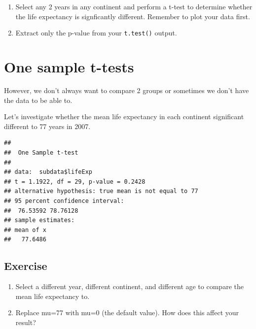\documentclass[]{book}
\makeatletter
\newenvironment{Shaded}{\begin{snugshade}}{\end{snugshade}}
\newcommand{\KeywordTok}[1]{\textcolor[rgb]{0.13,0.29,0.53}{\textbf{#1}}}
\newcommand{\DataTypeTok}[1]{\textcolor[rgb]{0.13,0.29,0.53}{#1}}
\newcommand{\DecValTok}[1]{\textcolor[rgb]{0.00,0.00,0.81}{#1}}
\newcommand{\StringTok}[1]{\textcolor[rgb]{0.31,0.60,0.02}{#1}}
\newcommand{\CommentTok}[1]{\textcolor[rgb]{0.56,0.35,0.01}{\textit{#1}}}
\newcommand{\OperatorTok}[1]{\textcolor[rgb]{0.81,0.36,0.00}{\textbf{#1}}}
\newcommand{\NormalTok}[1]{#1}
\newenvironment{kframe}{%
\medskip{}
\setlength{\fboxsep}{.8em}
 \def\at@end@of@kframe{}%
 \ifinner\ifhmode%
  \def\at@end@of@kframe{\end{minipage}}%
  \begin{minipage}{\columnwidth}%
 \fi\fi%
 \def\FrameCommand##1{\hskip\@totalleftmargin \hskip-\fboxsep
 \colorbox{shadecolor}{##1}\hskip-\fboxsep
     \hskip-\linewidth \hskip-\@totalleftmargin \hskip\columnwidth}%
 \MakeFramed {\advance\hsize-\width
   \@totalleftmargin\z@ \linewidth\hsize
   \@setminipage}}%
 {\par\unskip\endMakeFramed%
 \at@end@of@kframe}
\renewenvironment{Shaded}{\begin{kframe}}{\end{kframe}}
\makeatother
\begin{document}
\begin{enumerate}
\def\labelenumi{\arabic{enumi}.}
\item
  Select any 2 years in any continent and perform a t-test to determine
  whether the life expectancy is signficantly different. Remember to
  plot your data first.
\item
  Extract only the p-value from your \texttt{t.test()} output.
\end{enumerate}

\section{One sample t-tests}\label{one-sample-t-tests}

However, we don't always want to compare 2 groups or sometimes we don't
have the data to be able to.

Let's investigate whether the mean life expectancy in each continent
significant different to 77 years in 2007.

\begin{Shaded}
\end{Shaded}

\begin{verbatim}
## 
##  One Sample t-test
## 
## data:  subdata$lifeExp
## t = 1.1922, df = 29, p-value = 0.2428
## alternative hypothesis: true mean is not equal to 77
## 95 percent confidence interval:
##  76.53592 78.76128
## sample estimates:
## mean of x 
##   77.6486
\end{verbatim}

\subsection{Exercise}\label{exercise-32}

\begin{enumerate}
\def\labelenumi{\arabic{enumi}.}
\item
  Select a different year, different continent, and different age to
  compare the mean life expectancy to.
\item
  Replace mu=77 with mu=0 (the default value). How does this affect your
  result?
\end{enumerate}
\end{document}
